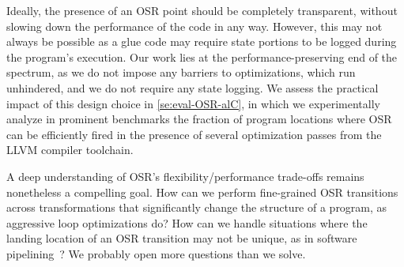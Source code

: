 Ideally, the presence of an OSR point should be completely transparent, without slowing down the performance of the code in any way. However, this may not always be possible as a glue code may require state portions to be logged during the program's execution. Our work lies at the performance-preserving end of the spectrum, as we do not impose any barriers to optimizations, which run unhindered, and we do not require any state logging. We assess the practical impact of this design choice in \mysection\ref{se:eval-OSR-alC}, in which we experimentally analyze in prominent benchmarks the fraction of program locations where OSR can be efficiently fired in the presence of several optimization passes from the LLVM compiler toolchain.


A deep understanding of OSR's flexibility/performance trade-offs remains nonetheless a compelling goal. How can we perform fine-grained OSR transitions across transformations that significantly change the structure of a program, as aggressive loop optimizations do? How can we handle situations where the landing location of an OSR transition may not be unique, as in software pipelining~\cite{Kundu09}? We probably open more questions than we solve.

